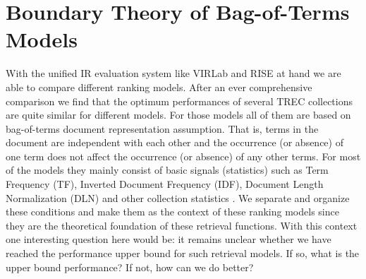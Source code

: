 \section{Boundary Theory of Bag-of-Terms Models}
With the unified IR evaluation system like VIRLab and RISE at hand we are 
able to compare different ranking models. After an ever comprehensive 
comparison \cite{Yang:2016:RSI:2970398.2970415,Yang:2016:ERP:2970398.2970428} 
we find that the optimum performances of several TREC collections are quite 
similar for different models. For those models \cite{Robertson96okapiat3,Singhal:1996:PDL:243199.243206,Zhai:2004:SSM:984321.984322,Amati:2002:PMI:582415.582416,Fang:2005:EAA:1076034.1076116,Lv:2011:LTF:2063576.2063584,He:2005:SDP:1076034.1076114} 
all of them are based on bag-of-terms document representation assumption. 
That is, terms in the document are independent with each other and the 
occurrence (or absence) of one term does not affect the occurrence (or absence) 
of any other terms.   
For most of the models they mainly consist of basic signals (statistics) 
such as Term Frequency (TF), Inverted Document Frequency (IDF), 
Document Length Normalization (DLN) and other collection statistics \cite{Fang:2004:FSI:1008992.1009004}. 
We separate and organize these conditions and make them as the context of 
these ranking models since they are the theoretical foundation of these 
retrieval functions.
With this context one interesting question here would be: 
it remains unclear whether we have reached the performance upper bound for 
such retrieval models. 
If so, what is the upper bound performance? If not, how can we do better?

